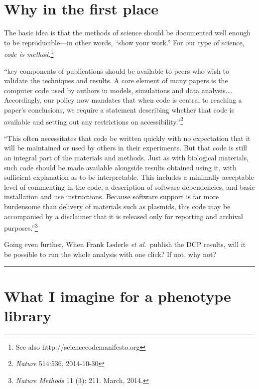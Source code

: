 \documentclass{tufte-handout}
\begin{document}
\section{Why in the first place}

The basic idea is that the methods of science should be documented
well enough to be reproducible---in other words, ``show your work.''
For our type of science, \emph{code is method.}\footnote{See also
http://sciencecodemanifesto.org}

``key components of publications should be available to peers who wish
to validate the techniques and results. A core element of many papers
is the computer code used by authors in models, simulations and data
analysis.\ldots{} Accordingly, our policy now mandates that when code
is central to reaching a paper's conclusions, we require a statement
describing whether that code is available and setting out any
restrictions on accessibility.''\footnote{\emph{Nature} 514:536,
  2014-10-30}

``This often necessitates that code be written quickly with no
expectation that it will be maintained or used by others in their
experiments. But that code is still an integral part of the materials
and methods. Just as with biological materials, such code should be
made available alongside results obtained using it, with sufficient
explanation as to be interpretable. This includes a minimally
acceptable level of commenting in the code, a description of software
dependencies, and basic installation and use instructions. Because
software support is far more burdensome than delivery of materials
such as plasmids, this code may be accompanied by a disclaimer that it
is released only for reporting and archival
purposes.''\footnote{\emph{Nature Methods} 11 (3): 211. March, 2014.}

Going even further, When Frank Lederle \emph{et al.}\ publish the DCP
results, will it be possible to run the whole analysis with one click?
If not, why not?

\noindent \rule{\textwidth}{1pt}










\section{What I imagine for a phenotype library}
\end{document}
